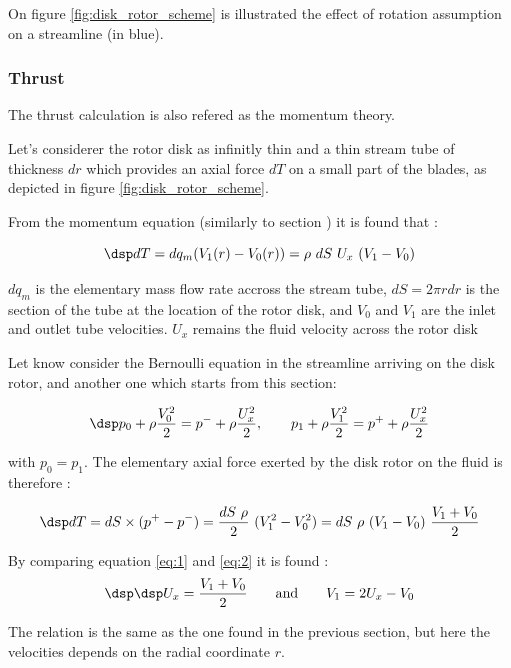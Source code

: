 On figure \ref{fig:disk_rotor_scheme} is illustrated the effect of rotation assumption on a streamline (in blue).

\subsubsection{ \sc Thrust}
\label{sec:thrust}

The thrust calculation is also refered as the  momentum theory.


Let's considerer the rotor disk as infinitly thin and a thin stream tube of thickness $dr$ which provides
an axial force $dT$ on a small part of the blades, as depicted in figure \ref{fig:disk_rotor_scheme}.

From the momentum equation  (similarly to section \label{sec:axial_force})  it is found that :

\begin{equation} \dsp 
dT = dq_m (V_1(r) - V_0(r)) = \rho~dS~U_x~(V_1 -V_0 )
\label{eq:1}
\end{equation}

$dq_m$ is the elementary mass flow rate accross the stream tube, $dS = 2 \pi r dr$ is the section of the tube
at the location of the rotor disk, and $V_0$ and $V_1$ are the inlet and outlet tube velocities.
$U_x$ remains the fluid velocity across the rotor disk 

Let know consider the Bernoulli equation in the streamline arriving on the disk rotor,
and another one which starts from this section:

$$ \dsp 
p_0 +\rho  \frac{V_0^2}{2} = p^- + \rho  \frac{U_x^2}{2}, \qquad
p_1 +\rho  \frac{V_1^2}{2} = p^+ + \rho  \frac{U_x^2}{2}
$$

with $p_0=p_1$. The elementary axial force exerted by the disk rotor on the fluid
is therefore :

\begin{equation} \dsp 
dT = dS \times (p^+-p^-) = \frac{dS ~\rho}{2}~(V_1^2-V_0^2)= dS ~\rho~(V_1-V_0)~ \frac{V_1+V_0}{2}
\label{eq:2}
\end{equation}

By comparing equation \eqref{eq:1} and \eqref{eq:2} it is found :
$$ \dsp
\dsp U_x = \frac{V_1+V_0}{2}  \qquad {\rm and} \qquad V_1 = 2 U_x -V_0
$$

The relation is the same as the one found in the previous section, but here the velocities depends on the
radial coordinate $r$.

